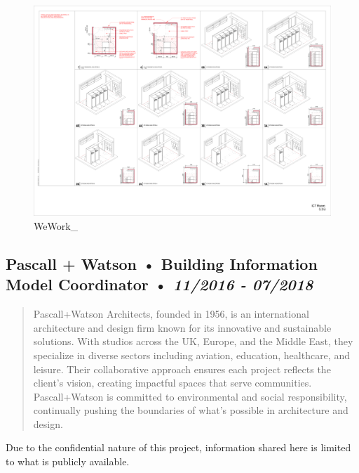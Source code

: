 \documentclass[
]{article}
\begin{document}
\begin{figure}[H]

{\centering \includegraphics{assets/WeWork/ww_design_standards-30.png}

}

\caption{WeWork\_}

\end{figure}%

\subsection{\texorpdfstring{Pascall + Watson • Building Information
Model Coordinator • \emph{11/2016 -
07/2018}}{Pascall + Watson • Building Information Model Coordinator • 11/2016 - 07/2018}}\label{pascall-watson-building-information-model-coordinator-112016---072018}

\begin{quote}
Pascall+Watson Architects, founded in 1956, is an international
architecture and design firm known for its innovative and sustainable
solutions. With studios across the UK, Europe, and the Middle East, they
specialize in diverse sectors including aviation, education, healthcare,
and leisure. Their collaborative approach ensures each project reflects
the client's vision, creating impactful spaces that serve communities.
Pascall+Watson is committed to environmental and social responsibility,
continually pushing the boundaries of what's possible in architecture
and design.
\end{quote}

Due to the confidential nature of this project, information shared here
is limited to what is publicly available.
\end{document}
